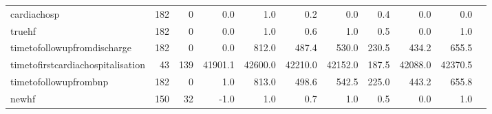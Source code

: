 \begin{scriptsize}
\begin{tabularx}{\textwidth}{P{3cm}RRRRRRRRRR}
  cardiachosp & 182 &   0 &     0.0 &      1.0 &     0.2 &     0.0 &     0.4 &     0.0 &     0.0 \\ 
  truehf & 182 &   0 &     0.0 &      1.0 &     0.6 &     1.0 &     0.5 &     0.0 &     1.0 \\ 
  timetofollowupfromdischarge & 182 &   0 &     0.0 &    812.0 &   487.4 &   530.0 &   230.5 &   434.2 &   655.5 \\ 
  timetofirstcardiachospitalisation &  43 & 139 & 41901.1 &  42600.0 & 42210.0 & 42152.0 &   187.5 & 42088.0 & 42370.5 \\ 
  timetofollowupfrombnp & 182 &   0 &     1.0 &    813.0 &   498.6 &   542.5 &   225.0 &   443.2 &   655.8 \\ 
  newhf & 150 &  32 &    -1.0 &      1.0 &     0.7 &     1.0 &     0.5 &     0.0 &     1.0 \\ 
\midrule
\end{tabularx}
\vspace*{-0,5cm}\parnotes
\end{scriptsize}